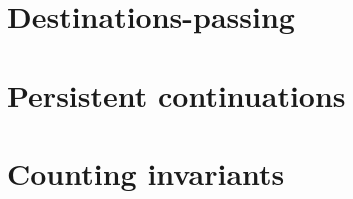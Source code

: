 


\section{Destinations-passing}
\label{sec:gen-destinations}


\section{Persistent continuations}
\label{sec:gen-letcc}

\section{Counting invariants}
\label{sec:gen-count}



\label{sec:pointer-inequality}
